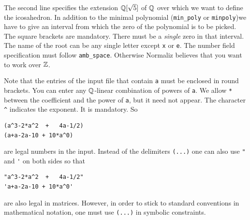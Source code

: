 \begin{minipage}[t]{0.4\textwidth}
\end{minipage}

The second line specifies the extension ${\mathbb Q}[\sqrt 5]$ of ${\mathbb Q}$ over which we want to define the icosahedron. In addition to the minimal polynomial (\verb|min_poly| or \verb|minpoly|)we have to give an interval from which the zero of the polynomial is to be picked. The square brackets are mandatory. There must be a \emph{single} zero in that interval. The name of the root can be any single letter except \verb|x| or \verb|e|. The number field specification must follow \verb|amb_space|. Otherwise Normaliz believes that you want to work over ${\mathbb Z}$.

Note that the entries of the input file that contain \verb|a| must be enclosed in round brackets. You can enter any ${\mathbb Q}$-linear combination of powers of \verb|a|. We allow \verb|*| between the coefficient and the power of \verb|a|, but it need not appear. The character \verb|^| indicates the exponent. It is mandatory. So
\begin{Verbatim}
(a^3-2*a^2  +   4a-1/2)
(a+a-2a-10 + 10*a^0)
\end{Verbatim}
are legal numbers in the input. Instead of the delimiters \verb|(...)| one can also use \verb|"| and \verb|'| on both sides so that
\begin{Verbatim}
"a^3-2*a^2  +   4a-1/2"
'a+a-2a-10 + 10*a^0'
\end{Verbatim}
are also legal in matrices. However, in order to stick to standard conventions in mathematical notation, one must use \verb|(...)| in symbolic constraints.

